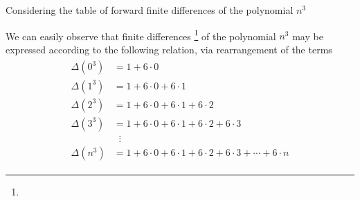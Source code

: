 Considering the table of forward finite differences of the polynomial $n^3$

We can easily observe that finite differences
\footnote{}
of the polynomial $n^3$ may be expressed according
to the following relation, via rearrangement of the terms
\begin{align}
    \label{eq:cubes_interpolation}
    \begin{split}
        \Delta(0^3) &= 1+6 \cdot 0 \\
        \Delta(1^3) &= 1+6\cdot0+6\cdot1 \\
        \Delta(2^3) &= 1+6\cdot0+6\cdot1+6\cdot2 \\
        \Delta(3^3) &= 1+6\cdot0+6\cdot1+6\cdot2+6\cdot3 \\
        &\; \; \vdots \\
        \Delta(n^3) &= 1+6\cdot0+6\cdot1+6\cdot2+6\cdot3+\cdots+6\cdot n
    \end{split}
\end{align}
